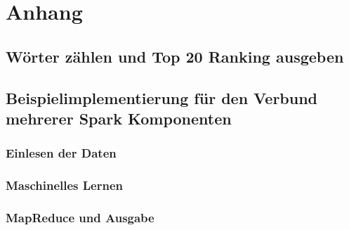 \newpage
\chapter{Anhang} 

\section{Wörter zählen und Top 20 Ranking ausgeben}\label{code:wordcount}





\newpage
\section{Beispielimplementierung für den Verbund mehrerer Spark Komponenten}
\subsection{Einlesen der Daten}\label{code:verbund_1}


\vspace{0.7cm}

\subsection{Maschinelles Lernen}\label{code:verbund_2}
 


\newpage
\subsection{MapReduce und Ausgabe}\label{code:verbund_3}
 
\vspace{0.7cm}
